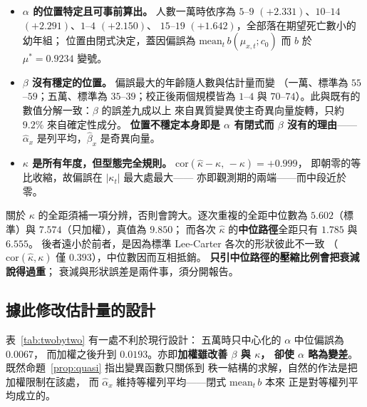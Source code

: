 \documentclass[UTF8, fontset=macnew, a4paper, 12pt]{ctexart}
\begin{document}
\begin{itemize}
\item \textbf{$\alpha$ 的位置特定且可事前算出。} 人數一萬時依序為
$5$--$9$ $(+2.331)$、$10$--$14$ $(+2.291)$、$1$--$4$ $(+2.150)$、
$15$--$19$ $(+1.642)$，全部落在期望死亡數小的幼年組；
位置由閉式決定，蓋因偏誤為 $\mathrm{mean}_t\,b(\mu_{x,t};c_0)$
而 $b$ 於 $\mu^\ast=0.9234$ 變號。
\item \textbf{$\beta$ 沒有穩定的位置。} 偏誤最大的年齡隨人數與估計量而變
（一萬、標準為 $55$--$59$；五萬、標準為 $35$--$39$；校正後兩個規模皆為
$1$--$4$ 與 $70$--$74$）。此與既有的數值分解一致：$\beta$ 的誤差九成以上
來自異質變異使主奇異向量旋轉，只約 $9.2\%$ 來自確定性成分。
\textbf{位置不穩定本身即是 $\alpha$ 有閉式而 $\beta$ 沒有的理由}——
$\hat\alpha_x$ 是列平均，$\hat\beta_x$ 是奇異向量。
\item \textbf{$\kappa$ 是所有年度，但型態完全規則。}
$\mathrm{cor}(\hat\kappa-\kappa,\,-\kappa)=+0.999$，
即朝零的等比收縮，故偏誤在 $|\kappa_t|$ 最大處最大——
亦即觀測期的兩端——而中段近於零。
\end{itemize}

關於 $\kappa$ 的全距須補一項分辨，否則會誇大。逐次重複的全距中位數為
$5.602$（標準）與 $7.574$（只加權），真值為 $9.850$；
而各次 $\hat\kappa$ 的\textbf{中位路徑}全距只有 $1.785$ 與 $6.555$。
後者遠小於前者，是因為標準 Lee-Carter 各次的形狀彼此不一致
（$\mathrm{cor}(\hat\kappa,\kappa)$ 僅 $0.393$），中位數因而互相抵銷。
\textbf{只引中位路徑的壓縮比例會把衰減說得過重}；
衰減與形狀誤差是兩件事，須分開報告。

\subsection{據此修改估計量的設計}\label{subsec:split}

表~\ref{tab:twobytwo} 有一處不利於現行設計：
五萬時只中心化的 $\alpha$ 中位偏誤為 $0.0067$，
而加權之後升到 $0.0193$。亦即\textbf{加權雖改善 $\beta$ 與 $\kappa$，
卻使 $\alpha$ 略為變差}。既然命題~\ref{prop:quasi} 指出變異函數只關係到
秩一結構的求解，自然的作法是把加權限制在該處，
而 $\hat\alpha_x$ 維持等權列平均——閉式 $\mathrm{mean}_t\,b$ 本來
正是對等權列平均成立的。
\end{document}
